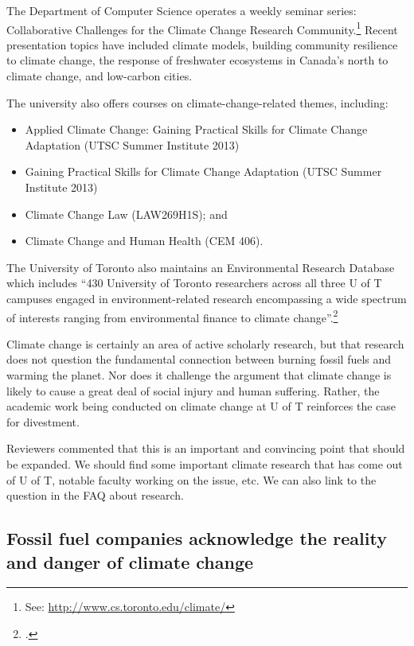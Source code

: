 The Department of Computer Science operates a weekly seminar series: Collaborative Challenges for the Climate Change Research Community.\footnote{See: \url{http://www.cs.toronto.edu/climate/}}
Recent presentation topics have included climate models, building community resilience to climate change, the response of freshwater ecosystems in Canada's north to climate change, and low-carbon cities.



The university also offers courses on climate-change-related themes, including:
\begin{itemize}
	\item Applied Climate Change: Gaining Practical Skills for Climate Change Adaptation (UTSC Summer Institute 2013)
	\item Gaining Practical Skills for Climate Change Adaptation (UTSC Summer Institute 2013)
	\item Climate Change Law (LAW269H1S); and
	\item Climate Change and Human Health (CEM 406).
\end{itemize}
The University of Toronto also maintains an Environmental Research Database which includes ``430 University of Toronto researchers across all three U of T campuses engaged in environment-related research encompassing a wide spectrum of interests ranging from environmental finance to climate change''.\footcite[][]{UTEnvResDB}



Climate change is certainly an area of active scholarly research, but that research does not question the fundamental connection between burning fossil fuels and warming the planet. 
Nor does it challenge the argument that climate change is likely to cause a great deal of social injury and human suffering.
Rather, the academic work being conducted on climate change at U of T reinforces the case for divestment.


\begin{vcom}
Reviewers commented that this is an important and convincing point that should be expanded. We should find some important climate research that has come out of U of T, notable faculty working on the issue, etc. We can also link to the question in the FAQ about research.
\end{vcom}



	\subsection{Fossil fuel companies acknowledge the reality and danger of climate change}




